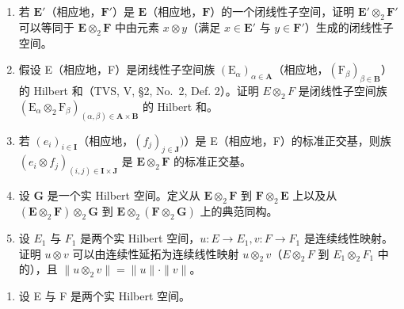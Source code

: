 \begin{enumerate}
\def\labelenumi{\alph{enumi})}
\item
  若 \(\mathbf{E}'\)（相应地，\(\mathbf{F}'\)）是 \(\mathbf{E}\)（相应地，\(\mathbf{F}\)）的一个闭线性子空间，证明 \(\mathbf{E}' \otimes_2 \mathbf{F}'\) 可以等同于 \(\mathbf{E} \otimes_2 \mathbf{F}\) 中由元素 \(x \otimes y\)（满足 \(x \in \mathbf{E}'\) 与 \(y \in \mathbf{F}'\)）生成的闭线性子空间。
\item
  假设 E（相应地，F）是闭线性子空间族 \((\mathrm{E}_{\alpha})_{\alpha\in\mathbf{A}}\)（相应地，\((\mathrm{F}_{\beta})_{\beta\in\mathbf{B}}\)）的 Hilbert 和（TVS, V, §2, No.~2, Def. 2）。证明 \(E\otimes_{2}F\) 是闭线性子空间族 \((\mathrm{E}_{\alpha}\otimes_{2}\mathrm{F}_{\beta})_{(\alpha,\beta)\in\mathbf{A}\times\mathbf{B}}\) 的 Hilbert 和。
\item
  若 \((e_i)_{i\in \mathbf{I}}\)（相应地，\((f_j)_{j\in \mathbf{J}})\)）是 E（相应地，F）的标准正交基，则族 \((e_i\otimes f_j)_{(i,j)\in \mathbf{I}\times \mathbf{J}}\) 是 \(\mathbf{E}\otimes_2\mathbf{F}\) 的标准正交基。
\item
  设 \(\mathbf{G}\) 是一个实 Hilbert 空间。定义从 \(\mathbf{E} \otimes_{2} \mathbf{F}\) 到 \(\mathbf{F} \otimes_{2} \mathbf{E}\) 上以及从 \((\mathbf{E} \otimes_{2} \mathbf{F}) \otimes_{2} \mathbf{G}\) 到 \(\mathbf{E} \otimes_{2} (\mathbf{F} \otimes_{2} \mathbf{G})\) 上的典范同构。
\item
  设 \(E_{1}\) 与 \(F_{1}\) 是两个实 Hilbert 空间，\(u:E\to E_{1}, v:F\to F_{1}\) 是连续线性映射。证明 \(u\otimes v\) 可以由连续性延拓为连续线性映射 \(u\otimes_{2}v\)（\(E\otimes_{2}F\) 到 \(E_{1}\otimes_{2}F_{1}\) 中的），且 \(\|u\otimes_{2}v\|=\|u\|\cdot\|v\|\)。
\end{enumerate}

\begin{enumerate}
\def\labelenumi{\arabic{enumi})}
\setcounter{enumi}{8}
\tightlist
\item
  设 E 与 F 是两个实 Hilbert 空间。
\end{enumerate}


